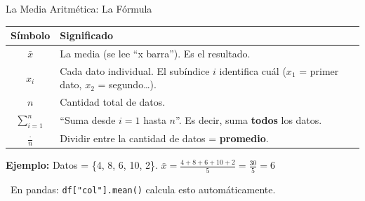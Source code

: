 \documentclass[aspectratio=169, 11pt]{beamer}
\begin{document}
\begin{frame}[shrink=10]{La Media Aritmética: La Fórmula}
  \vspace{-4pt}
  \begin{center}
  \end{center}

  \vspace{4pt}
  {\scriptsize
  \begin{tabular}{@{}cl@{}}
    \toprule
    \textbf{Símbolo} & \textbf{Significado} \\
    \midrule
    $\bar{x}$ & La media (se lee ``x barra''). Es el resultado. \\
    $x_i$ & Cada dato individual. El subíndice $i$ identifica cuál ($x_1$ = primer dato, $x_2$ = segundo\ldots). \\
    $n$ & Cantidad total de datos. \\
    $\sum_{i=1}^{n}$ & ``Suma desde $i=1$ hasta $n$''. Es decir, suma \textbf{todos} los datos. \\
    $\frac{\cdot}{n}$ & Dividir entre la cantidad de datos = \textbf{promedio}. \\
    \bottomrule
  \end{tabular}
  }

  \vspace{6pt}
  {\footnotesize\color{textDark}
    \textbf{Ejemplo:} Datos = \{4, 8, 6, 10, 2\}. \quad
    $\bar{x} = \frac{4+8+6+10+2}{5} = \frac{30}{5} = 6$}

  \vspace{4pt}
  {\scriptsize\color{textMuted}
    \faLightbulb\ En pandas: \texttt{df["col"].mean()} calcula esto automáticamente.}
\end{frame}
\end{document}

